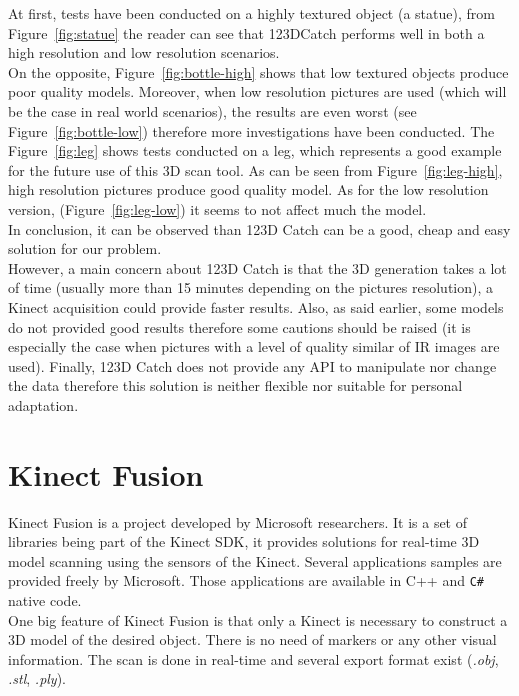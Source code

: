 At first, tests have been conducted on a highly textured object (a statue), from Figure~\ref{fig:statue} the reader can see that 123DCatch performs well in both a high resolution and low resolution scenarios. \\

On the opposite, Figure~\ref{fig:bottle-high} shows that low textured objects produce poor quality models. Moreover, when low resolution pictures are used (which will be the case in real world scenarios), the results are even worst (see Figure~\ref{fig:bottle-low}) therefore more investigations have been conducted. The Figure~\ref{fig:leg} shows tests conducted on a leg, which represents a good example for the future use of this 3D scan tool. As can be seen from Figure~\ref{fig:leg-high}, high resolution pictures produce good quality model. As for the low resolution version, (Figure~\ref{fig:leg-low}) it seems to not affect much the model.\\

In conclusion, it can be observed than 123D Catch can be a good, cheap and easy solution for our problem.\\

However, a main concern about 123D Catch is that the 3D generation takes a lot of time (usually more than 15 minutes 
depending on the pictures resolution), a Kinect acquisition could provide faster results. Also, as said earlier, some
models do not provided good results therefore some cautions should be raised (it is especially the case when pictures with a level of quality similar of IR images are used). Finally, 123D Catch does not provide any 
API to manipulate nor change the data therefore this solution is neither flexible nor suitable for personal adaptation.

\section{Kinect Fusion}
Kinect Fusion is a project developed by Microsoft researchers. It is a set of libraries being part of the Kinect SDK, it provides solutions for real-time 3D model scanning using the sensors of the Kinect. Several applications samples are provided freely by Microsoft. Those applications are available in C++ and \texttt{C\#} native code.\\ 

One big feature of Kinect Fusion is that only a Kinect is necessary to construct a 3D model of the desired object. There is no need of markers or any other visual information. The scan is done in real-time and several export format exist (\textit{.obj}, \textit{.stl}, \textit{.ply}). \\

